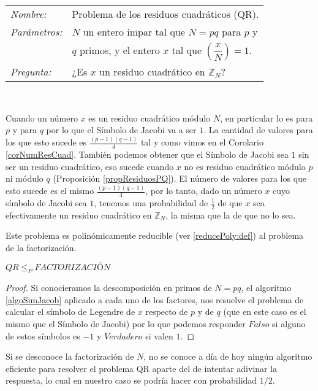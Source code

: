 \hfil

\begin{tabular}{|ll}\label{problemaQR}
	\textit{Nombre:} & Problema de los residuos cuadr\'aticos (QR). \\
	\textit{Parámetros:} & $N$ un entero impar tal que $N = pq$ para $p$ y \\
	& $q$ primos, y el entero $x$ tal que $\left( \dfrac{x}{N} \right) = 1$. \\
	\textit{Pregunta:} & ¿Es $x$ un residuo cuadrático en ${\mathbb Z}_N$? \\
\end{tabular}
\\

\hfil

Cuando un n\'umero $x$ es un residuo cuadr\'atico m\'odulo $N$, en particular lo
es para $p$ y para $q$ por lo que el S\'imbolo de Jacobi va a ser $1$. La cantidad
de valores para los que esto sucede es $\frac{(p-1)(q-1)}{4}$ tal y como vimos en
el Corolario \ref{corNumResCuad}. Tambi\'en podemos obtener que el S\'imbolo
de Jacobi sea $1$ sin ser un residuo cuadr\'atico, eso sucede cuando $x$ no es residuo
cuadr\'atico m\'odulo $p$ ni m\'odulo $q$ (Proposici\'on \ref{propResiduosPQ}). El n\'umero de valores para los que esto sucede
es el mismo $\frac{(p-1)(q-1)}{4}$, por lo tanto, dado un n\'umero $x$ cuyo s\'imbolo
de Jacobi sea $1$, tenemos una probabilidad de $\frac{1}{2}$ de que $x$ sea efectivamente
un residuo cuadr\'atico en ${\mathbb Z}_{N}$, la misma que la de que no lo sea.

Este problema es polin\'omicamente reducible (ver \ref{reducePoly:def}) al
problema de la factorizaci\'on.

\begin{proposition}
	 $QR \leq_P FACTORIZACIÓN$
\end{proposition}
\begin{proof}
Si conocieramos la descomposición en primos de $N = pq$, el algoritmo \ref{algoSimJacob} aplicado a cada uno de los factores,
nos resuelve el problema de calcular el símbolo de Legendre de $x$ respecto de $p$ y de $q$ (que en este caso es el mismo que el S\'imbolo de Jacobi)
por lo que podemos responder $Falso$ si alguno de estos s\'imbolos es $-1$ y $Verdadero$ si valen $1$.
\end{proof}

Si se desconoce la factorización de $N$, no se conoce a día de hoy ningún
algoritmo eficiente para resolver el problema QR aparte del de intentar
adivinar la respuesta, lo cual en nuestro caso se podr\'ia hacer con
probabilidad $1/2$.

